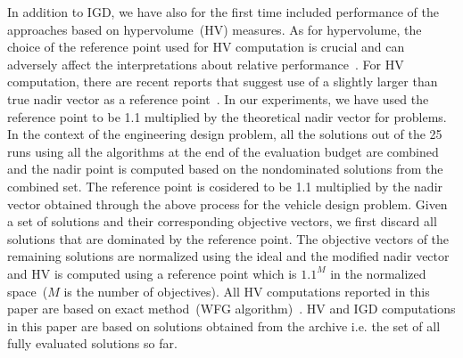 \documentclass[twocolumn,10pt]{asme2ej}
\begin{document}
 In addition to IGD, we have also for the first time included performance of the approaches based on hypervolume~(HV) measures. As for hypervolume, the choice of the reference point used for HV computation is crucial and can adversely affect the interpretations about relative performance~\cite{KHTYuan2016many,KHTishibuchi2010many}. For HV computation, there are recent reports that suggest use of a slightly larger than true nadir vector as a reference point~\cite{KHTYuan2016many,KHTishibuchi2010many}. In our experiments, we have used the reference point to be 1.1 multiplied by the theoretical nadir vector for problems. {\color{blue}In the context of the engineering design problem, all the solutions out of the 25 runs using all the algorithms at the end of the evaluation budget are combined and the nadir point is computed based on the nondominated solutions from the combined set. The reference point is cosidered to be 1.1 multiplied by the nadir vector obtained through the above process for the vehicle design problem.} Given a set of solutions and their corresponding objective vectors, we first discard all solutions that are dominated by the reference point. The objective vectors of the remaining solutions are normalized using the ideal and the modified nadir vector and HV is computed using a reference point which is $1.1^M$ in the normalized space~($M$ is the number of objectives). All HV computations reported in this paper are based on exact method~(WFG algorithm)~\cite{KHTwhile2012hv}. HV and IGD computations in this paper are based on solutions obtained from the archive i.e. the set of all fully evaluated solutions so far. 
\end{document}
